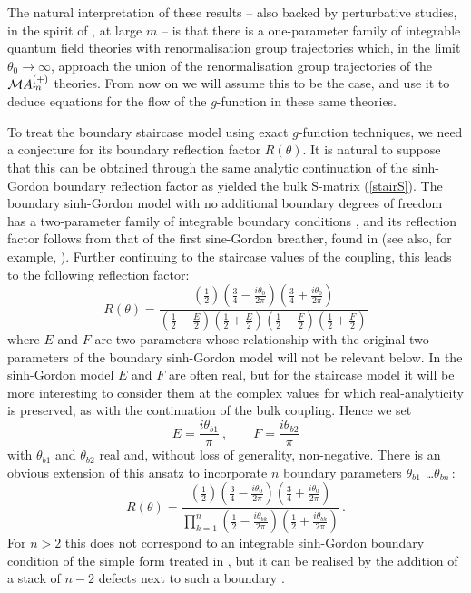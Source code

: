 \documentclass[11pt]{article}
\newcommand{\CM}{{\cal M}}
\newcommand\beq{\begin{equation}}
\newcommand\eeq{\end{equation}}
\newcommand{\tbi}{\theta_{b1}}
\newcommand{\tbii}{\theta_{b2}}
\newcommand{\tz}{\theta_0}
\begin{document}
The natural interpretation of these results -- also backed by
perturbative studies, in the spirit of \cite{Zamolodchikov:1987ti},
at large $m$ \cite{Lassig:1991ab} -- is that 
there is a one-parameter family of integrable quantum field theories 
with renormalisation group trajectories which, in the limit
$\tz\to\infty$, approach the union of the renormalisation
group trajectories of the $\CM A^{(+)}_m$ theories. From now on we
will assume this to be the case, and use it to deduce equations for
the flow of the $g$-function in these same theories. 

To treat the boundary staircase model using exact $g$-function
techniques, we need a conjecture for its boundary reflection factor
$R(\theta)$. It is natural to suppose that this can be obtained
through the same analytic continuation of the sinh-Gordon
boundary reflection factor as yielded the bulk S-matrix
(\ref{stairS}). The boundary sinh-Gordon model with no additional
boundary degrees of freedom has a two-parameter family of integrable
boundary conditions \cite{Ghoshal:1993tm}, and its reflection factor
follows from that of the first sine-Gordon breather, found in
\cite{Ghoshal:1993iq} (see also, for example, \cite{Corrigan:1999fp}).
Further continuing to the staircase values of the coupling, this leads
to the following reflection factor:
\beq
R(\theta)=\frac%
{(\frac{1}{2})(\frac{3}{4}-\frac{i\tz}{2\pi})
(\frac{3}{4}+\frac{i\tz}{2\pi})}%
{(\frac{1}{2}-\frac{E}{2})(\frac{1}{2}+\frac{E}{2})%
(\frac{1}{2}-\frac{F}{2})(\frac{1}{2}+\frac{F}{2})}
\label{R}
\eeq
where $E$ and $F$ are two parameters
whose relationship with the original two parameters of the boundary
sinh-Gordon model will not be relevant below. In the sinh-Gordon
model $E$ and $F$ are often real, but for the staircase model 
it will be more interesting to consider them at the complex values for
which real-analyticity is preserved, as with the 
continuation of the bulk coupling. Hence we set
\beq
E=\frac{i\tbi}{\pi}~,\qquad 
F=\frac{i\tbii}{\pi}
\eeq
with $\tbi$ and $\tbii$ real and, without loss of generality,
non-negative. There is an
obvious extension of this ansatz to incorporate $n$
boundary parameters $\theta_{b1}$ \dots $\theta_{bn}$\,:
\beq
R(\theta)=\frac%
{(\frac{1}{2})(\frac{3}{4}-\frac{i\tz}{2\pi})
(\frac{3}{4}+\frac{i\tz}{2\pi})}%
{\prod_{k=1}^{n}
(\frac{1}{2}-\frac{i\theta_{bk}}{2\pi})(\frac{1}{2}+\frac{i\theta_{bk}}{2\pi})}
\,.
\label{Rn}
\eeq
For $n>2$ this does not correspond to an integrable sinh-Gordon
boundary condition of the simple form treated in
\cite{Ghoshal:1993tm}, but it can be realised by the addition of a stack of
$n{-}2$ defects next to such a boundary \cite{Bowcock:2005vs,Bajnok:2007jg}.
\end{document}
